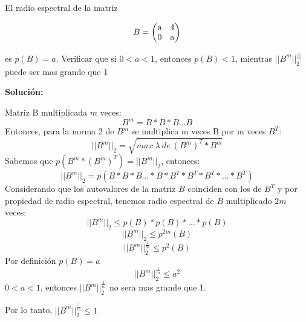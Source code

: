 El radio espectral de la matriz 
\begin{center}
\[
B
=
\begin{pmatrix}
     $a$ &  $4$\\
     $0$ &  $a$\\
\end{pmatrix}
\]
\end{center}
es $p(B) = a$. Verificar que si $0<a<1$, entonces $p(B)<1$, mientras $||B^m||_2^{\frac{1}{m}}$ puede ser mas grande que 1 

\textbf{Solución:}

Matriz B multiplicada $m$ veces:
\[
    B^m = B * B * B ... B
\]
Entonces, para la norma 2 de $B^m$ se multiplica m veces B por m veces $B^T$:
\[
    ||B^m||_2 = \sqrt{max \ \lambda \ de \ (B^m)^T*B^m}
\]
Sabemos que $p(B^m*(B^m)^T) = ||B^m||_2$, entonces:
\[
    ||B^m||_2 = p(B*B*B...*B*B^T*B^T*B^T*...*B^T)   
\]
Considerando que los autovalores de la matriz $B$ coinciden con los de $B^T$ y por propiedad de radio espectral, tenemos radio espectral de $B$ multiplicado $2m$ veces:
\[
    ||B^m||_2 \leq p(B)*p(B)*...*p(B)
\]
\[
    ||B^m||_2 \leq p^{2m}(B)
\]
\[
    ||B^m||_2^{\frac{1}{m}} \leq p^{2}(B)
\]
Por definición $p(B) = a$
\[
    ||B^m||_2^{\frac{1}{m}} \leq a^2
\]
$0 < a < 1$, entonces $||B^m||_2^{\frac{1}{m}}$ no sera mas grande que 1.

Por lo tanto, $||B^m||_2^{\frac{1}{m}} \leq 1 $
